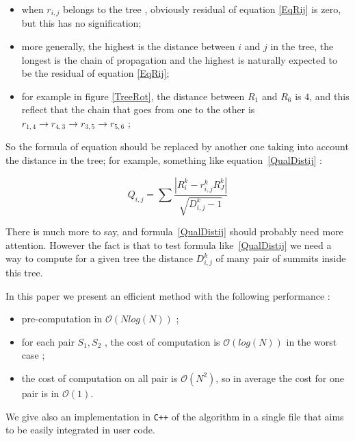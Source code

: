 \documentclass[a4paper]{article}
\begin{document}
\begin{itemize}
   \item  when $r_{i,j}$ belongs to the tree , obviously residual of equation \ref{EqRij}
          is zero, but this has no signification;

   \item  more generally, the highest is the distance between $i$ and $j$ in the tree,
          the longest is the chain of propagation and the highest is naturally expected
          to be the residual of equation \ref{EqRij};

   \item for example in figure \ref{TreeRot}, the distance between $R_1$ and $R_6$ is
         $4$, and this reflect that the chain that goes from one to the other is
         $r_{1,4} \rightarrow r_{4,3} \rightarrow  r_{3,5} \rightarrow r_{5,6}$ ;
\end{itemize}

So the formula of equation should be replaced by another one taking into account
the distance in the tree; for example, something like equation~\ref{QualDistij}  :

\begin{equation}
   Q_{i,j} = \sum \frac{|R^k_i - r^k_{i,j} R^k_J|}{\sqrt{D^k_{i,j}-1}} \label{QualDistij}
\end{equation}

There is much more to say, and formula~\ref{QualDistij} should probably
need more attention.  However the fact is that to test formula like~\ref{QualDistij}
we need a way to compute for a given tree the distance $D^k_{i,j}$ of many pair
of summits inside this tree.

In this paper we present an efficient  method with the following performance :

\begin{itemize}
   \item pre-computation in $\mathcal{O}(N log(N))$ ;
   \item for each pair $S_1,S_2$ , the cost of computation is $\mathcal{O}(log(N))$ in the worst case ;
   \item the cost of computation on all pair is $\mathcal{O}(N^2)$, so in average 
         the cost for one pair is in $\mathcal{O}(1)$.
\end{itemize}

We give also an implementation in {\tt C++} of the algorithm in a single file that aims
to be easily integrated in user code.

\end{document}
